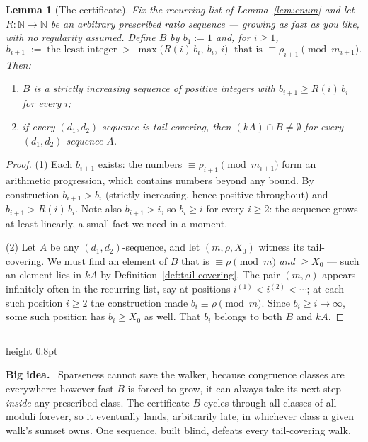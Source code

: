 \documentclass[11pt,reqno]{amsart}
\theoremstyle{plain}
\newtheorem{lemma}[theorem]{Lemma}
\theoremstyle{definition}
\theoremstyle{remark}
\newenvironment{bigidea}
  {\par\medskip\noindent\hspace*{0.02\linewidth}%
   \begin{minipage}{0.96\linewidth}
   {\color{blue!55!black}\hrule height 0.8pt}\vspace{6pt}
   \noindent\textbf{Big idea.}\ }
  {\par\vspace{6pt}{\color{blue!55!black}\hrule height 0.8pt}%
   \end{minipage}\par\medskip}
\newcommand{\NN}{\mathbb{N}}
\begin{document}
\begin{lemma}[The certificate]\label{lem:cert-friendly}
Fix the recurring list of Lemma~\ref{lem:enum} and let $R : \NN \to \NN$ be an
arbitrary prescribed ratio sequence --- growing as fast as you like, with no
regularity assumed. Define $B$ by $b_1 := 1$ and, for $i \ge 1$,
\[
  b_{i+1} \;:=\; \text{the least integer} \;>\; \max\big( R(i)\,b_i,\ b_i,\ i \big)
  \;\text{ that is } \equiv \rho_{i+1} \!\!\pmod{m_{i+1}} .
\]
Then:
\begin{enumerate}
\item $B$ is a strictly increasing sequence of positive integers with
      $b_{i+1} \ge R(i)\, b_i$ for every $i$;
\item if every $(d_1,d_2)$-sequence is tail-covering, then
      $(kA) \cap B \ne \emptyset$ for every $(d_1,d_2)$-sequence $A$.
\end{enumerate}
\end{lemma}

\begin{proof}
(1) Each $b_{i+1}$ exists: the numbers $\equiv \rho_{i+1} \pmod{m_{i+1}}$ form an
arithmetic progression, which contains numbers beyond any bound. By construction
$b_{i+1} > b_i$ (strictly increasing, hence positive throughout) and
$b_{i+1} > R(i)\,b_i$. Note also $b_{i+1} > i$, so $b_i \ge i$ for every $i \ge 2$:
the sequence grows at least linearly, a small fact we need in a moment.

(2) Let $A$ be any $(d_1,d_2)$-sequence, and let $(m, \rho, X_0)$ witness its
tail-covering. We must find an element of $B$ that is $\equiv \rho \pmod m$
\emph{and} $\ge X_0$ --- such an element lies in $kA$ by
Definition~\ref{def:tail-covering}. The pair $(m,\rho)$ appears infinitely often in
the recurring list, say at positions $i^{(1)} < i^{(2)} < \cdots$; at each such
position $i \ge 2$ the construction made $b_i \equiv \rho \pmod m$. Since
$b_i \ge i \to \infty$, some such position has $b_i \ge X_0$ as well. That $b_i$
belongs to both $B$ and $kA$.
\end{proof}

\begin{bigidea}
Sparseness cannot save the walker, because congruence classes are everywhere: however
fast $B$ is forced to grow, it can always take its next step \emph{inside} any
prescribed class. The certificate $B$ cycles through all classes of all moduli
forever, so it eventually lands, arbitrarily late, in whichever class a given walk's
sumset owns. One sequence, built blind, defeats every tail-covering walk.
\end{bigidea}
\end{document}
